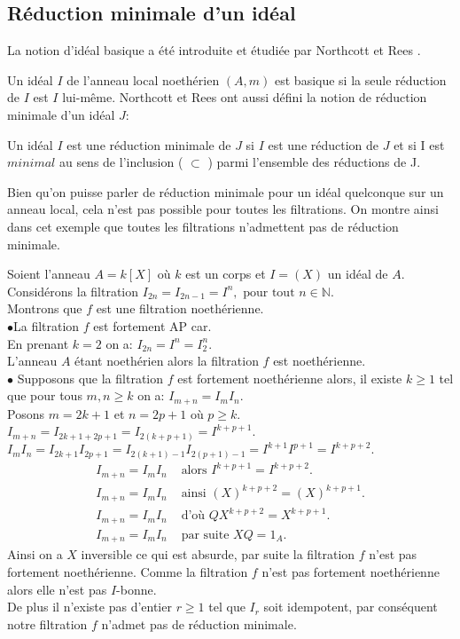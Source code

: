 \subsection{Réduction minimale d'un idéal}
La notion d'idéal basique a été introduite et étudiée par Northcott et Rees \cite{No}.
\begin{madefinition}
	Un idéal $I$ de l'anneau local noethérien $(A,m)$ est basique si la seule réduction de $I$ est $I$ lui-m\^{e}me. 
	Northcott et Rees ont aussi défini la notion de réduction minimale
	d'un idéal $J$:
	
	Un idéal $I$ est une réduction minimale de $J$ si $I$ est une réduction de $J$ et si I est $minimal$ au sens de l'inclusion ( $\subset$ ) parmi l'ensemble des réductions de J. 
\end{madefinition}
\begin{maremarque}
	Bien qu'on puisse parler de réduction minimale pour un idéal quelconque sur un anneau local, cela n'est pas possible pour toutes les filtrations. On montre ainsi dans cet exemple que toutes les filtrations n'admettent pas de réduction minimale.
\end{maremarque}
\begin{monexemple}
	Soient l'anneau $A = k\left[ X\right]$ où $k$ est un corps et $I = (X)$ un idéal de $A$.\\
	Considérons la filtration $I_{2n} = I_{2n-1} = I^n, \text{ pour tout } n \in \mathbb{N}$.\\
	Montrons que $f$ est une filtration noethérienne.\\
	$\bullet$La filtration $f$ est fortement AP car.\\En prenant $k = 2$ on a: $I_{2n} = I^n = I_2^n$.\\
	L’anneau $A$ étant noethérien alors la filtration $f$ est noethérienne.\\
	$\bullet$ Supposons que la filtration $f$ est fortement noethérienne alors, il existe $k \geq 1$ tel que pour tous $m, n \geq k$ on a: $I_{m+n} = I_m I_n$.\\
	Posons $m = 2k+1$ et $n = 2p+1$ où $p \geq k$.\\
	$I_{m+n} = I_{2k+1+2p+1} = I_{2(k+p+1)} = I^{k+p+1}$.\\
	$I_m I_n =  I_{2k+1}  I_{2p+1} =  I_{2(k+1)-1}  I_{2(p+1)-1} = I^{k+1} I^{p+1} = I^{k+p+2}.$
	\begin{align*}
		I_{m+n} = I_m I_n &\text{ alors } I^{k+p+1} = I^{k+p+2}.\\
		I_{m+n} = I_m I_n & \text{ ainsi } (X)^{k+p+2} = (X)^{k+p+1}.\\
		I_{m+n} = I_m I_n &\text{ d'où } QX^{k+p+2} = X^{k+p+1}.\\
		I_{m+n} = I_m I_n &\text{ par suite } XQ = 1_A.
	\end{align*}
	Ainsi on a $X$ inversible ce qui est absurde, par suite la filtration $f$ n'est pas fortement  noethérienne. Comme la filtration $f$ n'est pas fortement noethérienne alors elle n'est pas $I$-bonne.\\ De plus il n'existe pas d'entier $r \geq 1$ tel que $I_r$ soit idempotent, par conséquent notre filtration $f$ n'admet pas de réduction minimale.
\end{monexemple}
